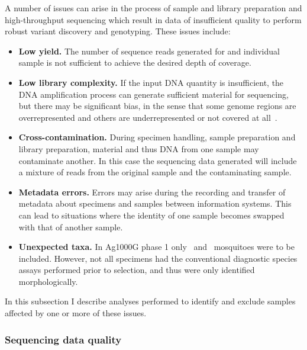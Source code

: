 \begin{refsection}
%
A number of issues can arise in the process of sample and library preparation and high-throughput sequencing which result in data of insufficient quality to perform robust variant discovery and genotyping.
%
These issues include:
%
\begin{itemize}
%
\item \textbf{Low yield.} The number of sequence reads generated for and individual sample is not sufficient to achieve the desired depth of coverage.
%
\item \textbf{Low library complexity.} If the input DNA quantity is insufficient, the DNA amplification process can generate sufficient material for sequencing, but there may be significant bias, in the sense that some genome regions are overrepresented and others are underrepresented or not covered at all~\parencite{Head2014}.
%
\item \textbf{Cross-contamination.} During specimen handling, sample preparation and library preparation, material and thus DNA from one sample may contaminate another.
%
In this case the sequencing data generated will include a mixture of reads from the original sample and the contaminating sample.
%
\item \textbf{Metadata errors.} Errors may arise during the recording and transfer of metadata about specimens and samples between information systems.
%
This can lead to situations where the identity of one sample becomes swapped with that of another sample.
%
\item \textbf{Unexpected taxa.} In Ag1000G phase 1 only \agam\ and \acol\ mosquitoes were to be included.
%
However, not all specimens had the conventional diagnostic species assays performed prior to selection, and thus were only identified morphologically.
\end{itemize}
%
In this subsection I describe analyses performed to identify and exclude samples affected by one or more of these issues.


\subsubsection{Sequencing data quality}



\end{refsection}
